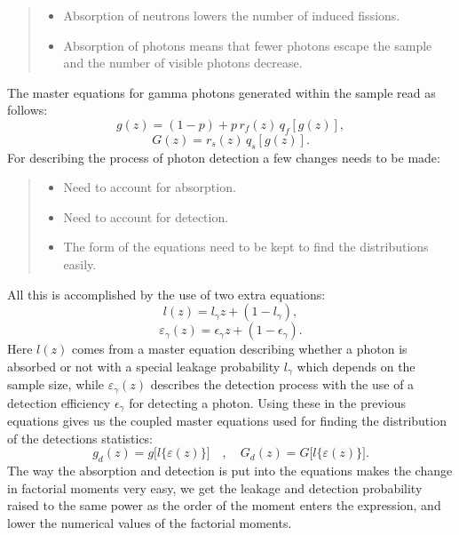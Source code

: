 \documentclass[landscape,a0,final,a4resizeable]{a0poster}
\newenvironment{poster}{
  \begin{center}
  \begin{minipage}[c]{0.98\textwidth}
}{
  \end{minipage}
  \end{center}
}
\begin{document}
\begin{poster}
\begin{multicols}{4}
\begin{quote}
\begin{itemize}
\item Absorption of neutrons lowers the number of induced
fissions.

\item Absorption of photons means that fewer photons escape the
sample and the number of visible photons decrease.
\end{itemize}
\end{quote}
\vspace{5mm} The master equations for gamma photons generated
within the sample read as follows:
\begin{equation}
\label{eq:gz} g(z)=(1-p)+ p \, r_f(z) \, q_f[g(z)],
\end{equation}
\begin{equation}
\label{eq:Gz} G(z)=r_s(z) \, q_s[g(z)].
\end{equation}
For describing the process of photon detection a few changes needs
to be made: \vspace{0.5cm}
\begin{quote}
\begin{itemize}
\item Need to account for absorption.

\item Need to account for detection.

\item The form of the equations need to be kept to find the
distributions easily.
\end{itemize}
\end{quote} \vspace{0.5cm}
All this is accomplished by the use of two extra equations:
\begin{equation}
\label{eq:lz} l(z)=l_{\gamma} z + (1-l_{\gamma}),
\end{equation}
\begin{equation}
\label{eq:egz} \varepsilon_{\gamma}(z)=\epsilon_{\gamma} z +
(1-\epsilon_{\gamma}).
\end{equation}
Here $l(z)$ comes from a master equation describing whether a
photon is absorbed or not with a special leakage probability
$l_{\gamma}$ which depends on the sample size, while
$\varepsilon_{\gamma}(z)$ describes the detection process with the
use of a detection efficiency $\epsilon_{\gamma}$ for detecting a
photon. Using these in the previous equations gives us the coupled
master equations used for finding the distribution of the
detections statistics:
\begin{equation}
\label{eq:gd} g_d(z) = g\big[l \{\varepsilon(z)\}\big] \quad ,
\quad G_d(z) =
 G\big[l \{\varepsilon(z)\}\big].
\end{equation}
The way the absorption and detection is put into the equations
makes the change in factorial moments very easy, we get the
leakage and detection probability raised to the same power as the
order of the moment enters the expression, and lower the numerical
values of the factorial moments.



\end{multicols}
\end{poster}
\end{document}
